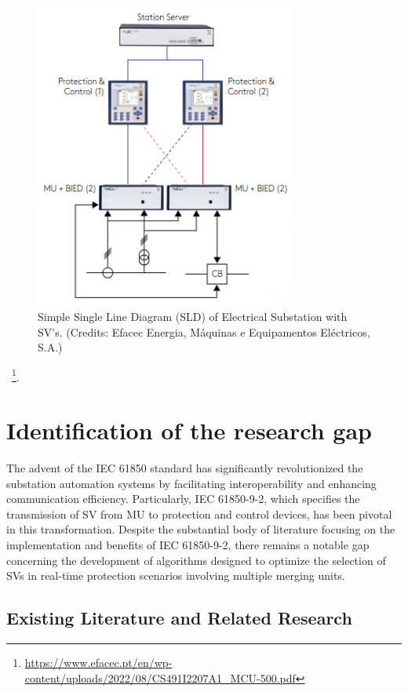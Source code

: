 \begin{figure}[tbh]
	\centering
	\includegraphics[width=0.77\textwidth, keepaspectratio]{ch3/assets/SLD_Diagram.png}
	\caption{Simple Single Line Diagram (SLD) of Electrical Substation with SV's. (Credits: Efacec Energia, Máquinas e Equipamentos Eléctricos, S.A.)}
	\label{fig:SLD_Diagram}
\end{figure}
\FloatBarrier


~\footnote{\url{https://www.efacec.pt/en/wp-content/uploads/2022/08/CS491I2207A1_MCU-500.pdf}}.
\FloatBarrier

\section{Identification of the research gap}

The advent of the IEC 61850 standard has significantly revolutionized the substation automation systems by facilitating interoperability and enhancing communication efficiency. Particularly, IEC 61850-9-2, which specifies the transmission of SV from MU to protection and control devices, has been pivotal in this transformation. Despite the substantial body of literature focusing on the implementation and benefits of IEC 61850-9-2, there remains a notable gap concerning the development of algorithms designed to optimize the selection of SVs in real-time protection scenarios involving multiple merging units.

\subsection{Existing Literature and Related Research}

